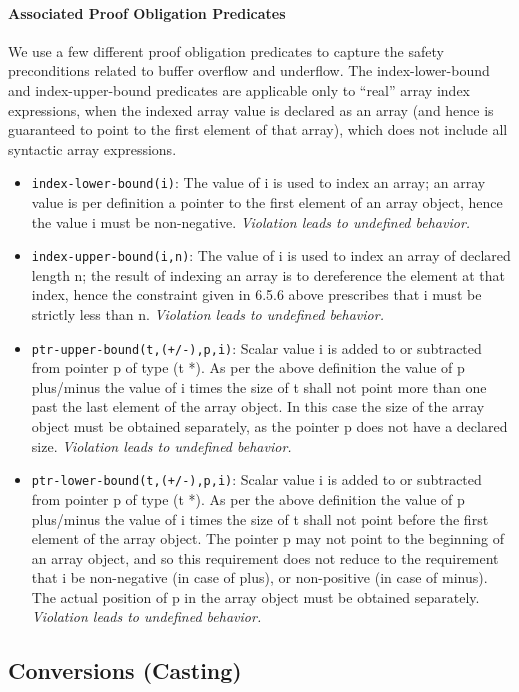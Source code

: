\documentclass[11pt]{article}
\begin{document}
\paragraph{Associated Proof Obligation Predicates}
We use a few different proof obligation predicates to capture the safety
preconditions related to buffer overflow and underflow. The index-lower-bound
and index-upper-bound predicates are applicable only to ``real'' array
index expressions, when the indexed array value is declared as an array
(and hence is guaranteed to point to the first element of that array), 
which does not include all syntactic array expressions.

\begin{itemize}
\item {\tt index-lower-bound(i)}: The value of i is used to index an array;
an array value is per definition a pointer to the first element of an
array object, hence the value i must be non-negative. 
\emph{Violation leads to undefined behavior.}
\item {\tt index-upper-bound(i,n)}: The value of i is used to index an array
of declared length n; the result of indexing an array is to dereference the
element at that index, hence the constraint given in 6.5.6 above prescribes
that i must be strictly less than n. 
\emph{Violation leads to undefined behavior.}
\item {\tt ptr-upper-bound(t,(+/-),p,i)}: Scalar value i is added to or 
subtracted from pointer p of type (t *). As per the above definition the
value of p plus/minus the value of i times the size of t shall not point
more than one past the last element of the array object. In this case the
size of the array object must be obtained separately, as the pointer p
does not have a declared size. 
\emph{Violation leads to undefined behavior.}
\item  {\tt ptr-lower-bound(t,(+/-),p,i)}: Scalar value i is added to or
subtracted from pointer p of type  (t *). As per the above definition the
value of p plus/minus the  value of i times the size of t shall not point
before the first element of the array object. The pointer p may not point
to the beginning of an array object, and so this requirement does not 
reduce to the requirement that i be non-negative (in case of plus), or
non-positive (in case of minus). The actual position of p in the array
object must be obtained separately.
\emph{Violation leads to undefined behavior.}
\end{itemize}

\subsection{Conversions (Casting)}
\label{app:conversion}
\end{document}
